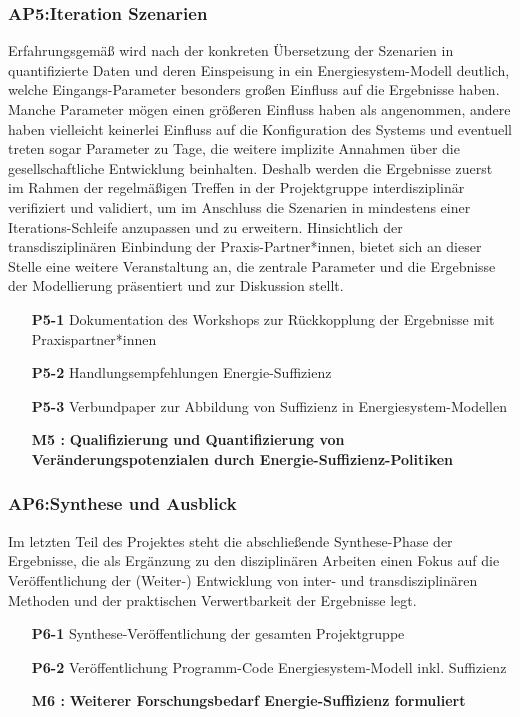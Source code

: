 \documentclass[a4paper,11pt,twoside]{scrartcl}
\begin{document}
\subsubsection*{AP5:Iteration Szenarien}
Erfahrungsgemäß wird nach der konkreten Übersetzung der Szenarien in quantifizierte Daten und deren Einspeisung in ein Energiesystem-Modell deutlich, welche Eingangs-Parameter besonders großen Einfluss auf die Ergebnisse haben. Manche Parameter mögen einen größeren Einfluss haben als angenommen, andere haben vielleicht keinerlei Einfluss auf die Konfiguration des Systems und eventuell treten sogar Parameter zu Tage, die weitere implizite Annahmen über die gesellschaftliche Entwicklung beinhalten. Deshalb werden die Ergebnisse zuerst im Rahmen der regelmäßigen Treffen in der Projektgruppe interdisziplinär verifiziert und validiert, um im Anschluss die Szenarien in mindestens einer Iterations-Schleife anzupassen und zu erweitern. Hinsichtlich der transdisziplinären Einbindung der Praxis-Partner*innen, bietet sich an dieser Stelle eine weitere Veranstaltung an, die zentrale Parameter und die Ergebnisse der Modellierung präsentiert und zur Diskussion stellt.
\begin{itemize}
    \item[\textbf{P5-1}] Dokumentation des Workshops zur Rückkopplung der Ergebnisse mit Praxispartner*innen
    \item[\textbf{P5-2}] Handlungsempfehlungen Energie-Suffizienz
    \item[\textbf{P5-3}] Verbundpaper zur Abbildung von Suffizienz in Energiesystem-Modellen
    \item[\textbf{M5 :}] \textbf{Qualifizierung und Quantifizierung von Veränderungspotenzialen durch Energie-Suffizienz-Politiken}
\end{itemize}

\subsubsection*{AP6:Synthese und Ausblick}
Im letzten Teil des Projektes steht die abschließende Synthese-Phase der Ergebnisse, die als Ergänzung zu den disziplinären Arbeiten einen Fokus auf die Veröffentlichung der (Weiter-) Entwicklung von inter- und transdisziplinären Methoden und der praktischen Verwertbarkeit der Ergebnisse legt.
\begin{itemize}
    \item[\textbf{P6-1}] Synthese-Veröffentlichung der gesamten Projektgruppe
    \item[\textbf{P6-2}] Veröffentlichung Programm-Code Energiesystem-Modell inkl. Suffizienz
    \item[\textbf{M6 :}] \textbf{Weiterer Forschungsbedarf Energie-Suffizienz formuliert}
\end{itemize}
\end{document}
